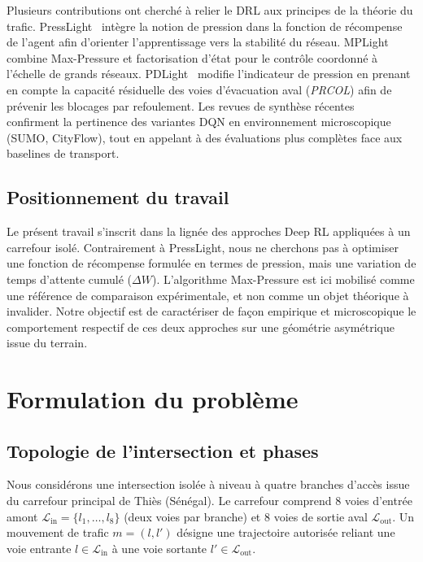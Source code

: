\documentclass[11pt,a4paper]{article}
\begin{document}
Plusieurs contributions ont cherché à relier le DRL aux principes de la théorie du trafic. PressLight~\cite{wei2019presslight} intègre la notion de pression dans la fonction de récompense de l'agent afin d'orienter l'apprentissage vers la stabilité du réseau. MPLight~\cite{chen2020toward} combine Max-Pressure et factorisation d'état pour le contrôle coordonné à l'échelle de grands réseaux. PDLight~\cite{zhang2020pdlight} modifie l'indicateur de pression en prenant en compte la capacité résiduelle des voies d'évacuation aval (\emph{PRCOL}) afin de prévenir les blocages par refoulement. Les revues de synthèse récentes~\cite{wei2021survey,zhao2024survey} confirment la pertinence des variantes DQN en environnement microscopique (SUMO, CityFlow), tout en appelant à des évaluations plus complètes face aux baselines de transport.

\subsection{Positionnement du travail}
Le présent travail s'inscrit dans la lignée des approches Deep RL appliquées à un carrefour isolé. Contrairement à PressLight, nous ne cherchons pas à optimiser une fonction de récompense formulée en termes de pression, mais une variation de temps d'attente cumulé ($\Delta W$). L'algorithme Max-Pressure est ici mobilisé comme une référence de comparaison expérimentale, et non comme un objet théorique à invalider. Notre objectif est de caractériser de façon empirique et microscopique le comportement respectif de ces deux approches sur une géométrie asymétrique issue du terrain.

\section{Formulation du problème}
\label{sec:formulation}

\subsection{Topologie de l'intersection et phases}
Nous considérons une intersection isolée à niveau à quatre branches d'accès issue du carrefour principal de Thiès (Sénégal). Le carrefour comprend 8 voies d'entrée amont $\mathcal{L}_{\text{in}} = \{l_1, \dots, l_8\}$ (deux voies par branche) et 8 voies de sortie aval $\mathcal{L}_{\text{out}}$. Un mouvement de trafic $m = (l, l')$ désigne une trajectoire autorisée reliant une voie entrante $l \in \mathcal{L}_{\text{in}}$ à une voie sortante $l' \in \mathcal{L}_{\text{out}}$.
\end{document}
